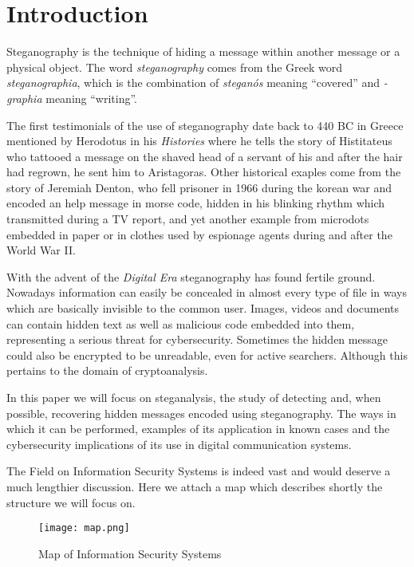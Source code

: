 \documentclass[../../main.tex]{subfiles}
\begin{document}
\section{Introduction}

Steganography is the technique of hiding a message within another message or a
physical object.\cite{steganography-definition}
The word \emph{steganography} comes from the Greek word
\emph{steganographia}, which is the combination of \emph{steganós} meaning
``covered'' and \emph{-graphia} meaning ``writing''.

The first testimonials of the use of steganography date back to 440 BC in Greece
mentioned by Herodotus in his \emph{Histories} where he tells the story of Histitateus who tattooed a message on the shaved head of a servant of his
and after the hair had regrown, he sent him to Aristagoras.
Other historical exaples come from the story of Jeremiah Denton, who fell prisoner in 1966 during the korean
war and encoded an help message in morse code, hidden in his blinking rhythm which transmitted during a TV report, and yet another example from microdots
embedded in paper or in clothes used by espionage agents during and after the World War II.

With the advent of the \emph{Digital Era} steganography has found fertile ground. Nowadays information can easily
be concealed in almost every type of file in ways which are basically invisible to the common user. Images, videos and documents 
can contain hidden text as well as malicious code embedded into them, representing a serious threat for cybersecurity. 
Sometimes the hidden message could also be encrypted to be unreadable, even for active searchers. Although this pertains to the domain of cryptoanalysis. 

In this paper we will focus on steganalysis, the study of detecting and, when
possible, recovering hidden messages encoded using steganography. The ways in
which it can be performed, examples of its application in known cases and
the cybersecurity implications of its use in digital communication systems.

The Field on Information Security Systems is indeed vast and would deserve a much lengthier discussion. 
Here we attach a map which describes shortly the structure we will focus on.

\begin{figure}[h]
    \centering
    \caption{Map of Information Security Systems \cite{modern-text-hiding}}
    \texttt{[image: map.png]}
\end{figure}
\end{document}
